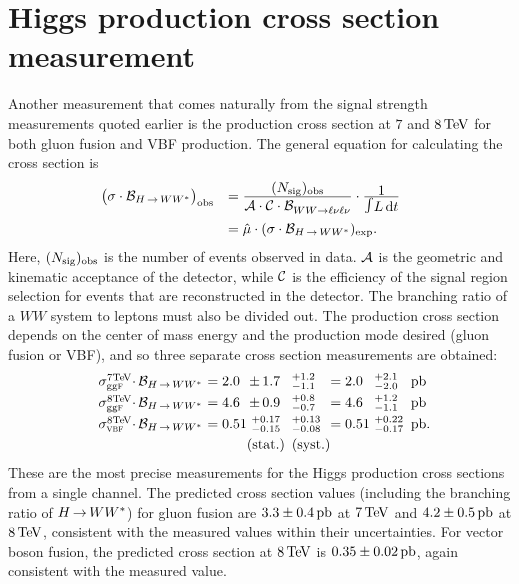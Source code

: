 \section{Higgs production cross section measurement}

Another measurement that comes naturally from the signal strength measurements quoted earlier is the production cross section at $7$ and $8 \TeV$ for both gluon fusion and VBF production. The general equation for calculating the cross section is
%
\begin{equation}
\begin{array}{ll}
\nq\big(\sigma \cdot\mathcal{B}_{\HWW}\big)_\obs
&=
\frac{\displaystyle (\Nsig)_\obs}
     {\displaystyle \Acc\cdot\Cor\cdot\mathcal{B}_{WW\rightarrow \ell\nu\ell\nu}^{\phantom{X}}}
\cdot
\frac{\displaystyle 1}{\displaystyle\Lint} \\
\clineskip
\clineskip
&= 
{\displaystyle \hat{\mu} \cdot (\sigma\cdot\mathcal{B}_{\HWW})_\exp}.
\end{array}
\label{eqn:xsec}
\end{equation}
%
Here, $(N_{\rm sig})_{\rm obs}$ is the number of events observed in data. $\mathcal{A}$ is the geometric and kinematic acceptance of the detector, while $\mathcal{C}$ is the efficiency of the signal region selection for events that are reconstructed in the detector. The branching ratio of a $WW$ system to leptons must also be divided out. The production cross section depends on the center of mass energy and the production mode desired (gluon fusion or VBF), and so three separate cross section measurements are obtained:
%
\begin{equation}
\begin{array}{lllllll}
\np\sigma_{\scggF}^{7\!\TeV}{\!\CDOT}\mathcal{B}_{\HWW}\np&= 2.0 \np\no&{\PM}1.7            \no\!&^{+1.2}_{-1.1}  \np\no&=2.0 \np\no&\,\,^{+2.1}_{-2.0}   \np&\pb \nq\\ \clineskip
\np\sigma_{\scggF}^{8\!\TeV}{\!\CDOT}\mathcal{B}_{\HWW}\np&= 4.6 \np\no&{\PM}0.9            \no\!&^{+0.8}_{-0.7}  \np\no&=4.6 \np\no&\,\,^{+1.2}_{-1.1}    \np&\pb \nq\\ \clineskip
\np\sigma_{\scVX }^{8\!\TeV}{\!\CDOT}\mathcal{B}_{\HWW}\np&= 0.51\np\no&\,\,^{+0.17}_{-0.15}\no\!&^{+0.13}_{-0.08}\np\no&=0.51\np\no&\,\,^{+0.22}_{-0.17} \np&\pb.\nq\\ \clineskip
\np                                                       &      \np\no&\textrm{(stat.)}    \no\!&\textrm{(syst.)}\np\no
\end{array}
\label{eqn:xsec_vals}
\end{equation}
%
These are the most precise measurements for the Higgs production cross sections from a single channel. The predicted cross section values (including the branching ratio of $H{\,{\rightarrow}\,}WW^\ast$) for gluon fusion are $3.3 \pm 0.4 \mbox{\,pb}$ at $7 \TeV$ and $4.2 \pm 0.5 \mbox{\,pb}$ at $8 \TeV$, consistent with the measured values within their uncertainties. For vector boson fusion, the predicted cross section at $8 \TeV$ is $0.35 \pm 0.02 \mbox{\,pb}$, again consistent with the measured value. 

